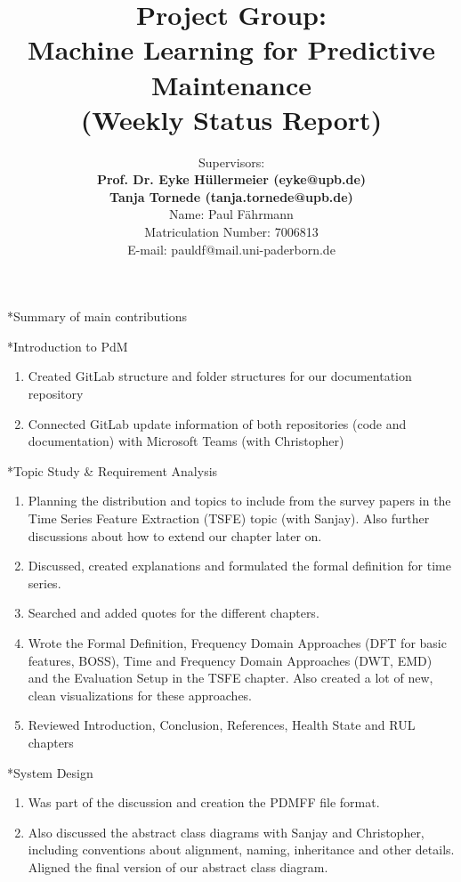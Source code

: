\documentclass[11pt,a4paper]{article}
\title{Project Group:\\
\textbf{Machine Learning for Predictive Maintenance}\\
(Weekly Status Report)}
\author{Supervisors:\\
\textbf{Prof. Dr. Eyke H{\"u}llermeier (eyke@upb.de)}\\
\textbf{Tanja Tornede (tanja.tornede@upb.de)}\\ 
\vspace{10mm}
Name: Paul Fährmann \\
Matriculation Number: 7006813\\
E-mail: pauldf@mail.uni-paderborn.de
}
\date{}
\begin{document}
\maketitle
\thispagestyle{empty}

\clearpage
{}

\newpage
\begin{section}*{Summary of main contributions}
	\begin{subsection}*{Introduction to PdM}
		\begin{enumerate}
			\item Created GitLab structure and folder structures for our documentation repository
			\item Connected GitLab update information of both repositories (code and documentation) with Microsoft Teams (with Christopher)
		\end{enumerate}
	\end{subsection}
	\begin{subsection}*{Topic Study \& Requirement Analysis}
		\begin{enumerate}
			\item Planning the distribution and topics to include from the survey papers in the Time Series Feature Extraction (TSFE) topic (with Sanjay). Also further discussions about how to extend our chapter later on.
			\item Discussed, created explanations and formulated the formal definition for time series.
			\item Searched and added quotes for the different chapters.
			\item Wrote the Formal Definition, Frequency Domain Approaches (DFT for basic features, BOSS), Time and Frequency Domain Approaches (DWT, EMD) and the Evaluation Setup in the TSFE chapter. Also created a lot of new, clean visualizations for these approaches.
			\item Reviewed Introduction, Conclusion, References, Health State and RUL chapters
		\end{enumerate}
	\end{subsection}
	\begin{subsection}*{System Design}
		\begin{enumerate}
			\item Was part of the discussion and creation the PDMFF file format.
			\item Also discussed the abstract class diagrams with Sanjay and Christopher, including conventions about alignment, naming, inheritance and other details. Aligned the final version of our abstract class diagram.

\end{enumerate}
\end{subsection}
\end{section}
\end{document}
